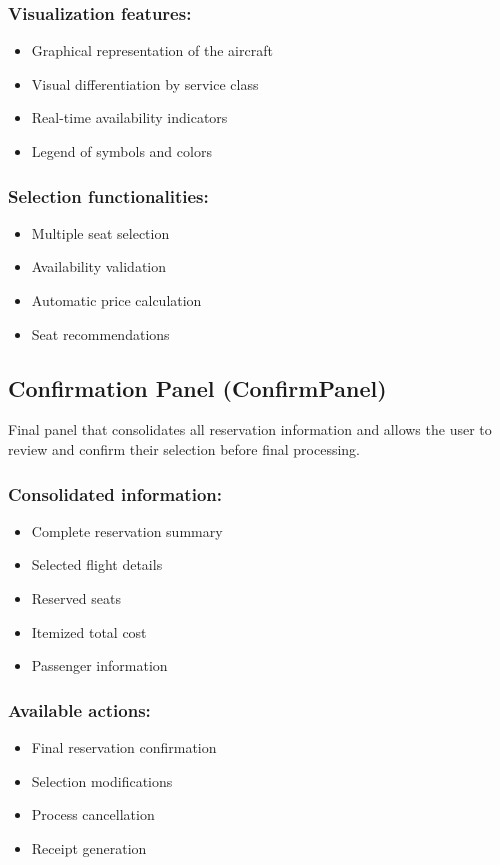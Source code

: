 \documentclass[conference]{IEEEtran}
\begin{document}
\subsubsection{Visualization features:}
\begin{itemize}
    \item Graphical representation of the aircraft
    \item Visual differentiation by service class
    \item Real-time availability indicators
    \item Legend of symbols and colors
\end{itemize}

\subsubsection{Selection functionalities:}
\begin{itemize}
    \item Multiple seat selection
    \item Availability validation
    \item Automatic price calculation
    \item Seat recommendations
\end{itemize}

\subsection{Confirmation Panel (ConfirmPanel)}
Final panel that consolidates all reservation information and allows the user to review and confirm their selection before final processing.

\subsubsection{Consolidated information:}
\begin{itemize}
    \item Complete reservation summary
    \item Selected flight details
    \item Reserved seats
    \item Itemized total cost
    \item Passenger information
\end{itemize}

\subsubsection{Available actions:}
\begin{itemize}
    \item Final reservation confirmation
    \item Selection modifications
    \item Process cancellation
    \item Receipt generation
\end{itemize}
\end{document}
